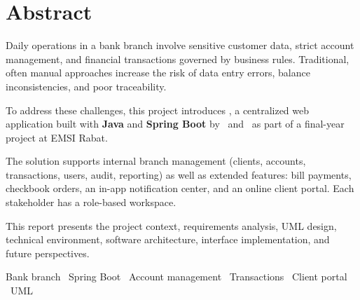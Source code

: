 \chapter*{Abstract}

Daily operations in a bank branch involve sensitive customer data, strict account management, and financial transactions governed by business rules. Traditional, often manual approaches increase the risk of data entry errors, balance inconsistencies, and poor traceability.

To address these challenges, this project introduces \textbf{\nomapplication}, a centralized web application built with \textbf{Java} and \textbf{Spring Boot} by \etudianteun\ and \etudiantedeux\ as part of a final-year project at EMSI Rabat.

The solution supports internal branch management (clients, accounts, transactions, users, audit, reporting) as well as extended features: bill payments, checkbook orders, an in-app notification center, and an online client portal. Each stakeholder has a role-based workspace.

This report presents the project context, requirements analysis, UML design, technical environment, software architecture, interface implementation, and future perspectives.

\begin{ambox}[title=Keywords]
Bank branch \textbullet\ Spring Boot \textbullet\ Account management \textbullet\ Transactions \textbullet\ Client portal \textbullet\ UML
\end{ambox}
